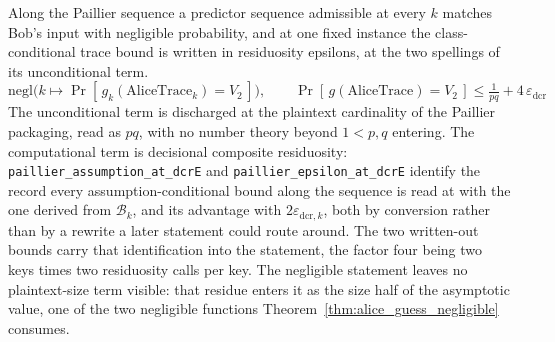 \begin{corollary}
  \label{cor:paillier_security}
  \rocqok
  Along the Paillier sequence a predictor sequence admissible at every $k$
  matches Bob's input with negligible probability, and at one fixed instance
  the class-conditional trace bound is written in residuosity epsilons, at
  the two spellings of its unconditional term.
  \[ \mathrm{negl}\big(k \mapsto
       \Pr[\,g_k(\mathrm{AliceTrace}_k) = V_2\,]\big), \qquad
     \Pr[\,g(\mathrm{AliceTrace}) = V_2\,]
       \le \tfrac{1}{p q} + 4\,\varepsilon_{\mathrm{dcr}} \]
  The unconditional term is discharged at the plaintext cardinality of the
  Paillier packaging, read as $p q$, with no number theory beyond $1 < p, q$
  entering. The computational term is decisional composite residuosity:
  \texttt{paillier\_assumption\_at\_dcrE} and
  \texttt{paillier\_epsilon\_at\_dcrE} identify the record every
  assumption-conditional bound along the sequence is read at with the one
  derived from $\mathcal{B}_k$, and its advantage with
  $2\varepsilon_{\mathrm{dcr},k}$, both by conversion rather than by a rewrite
  a later statement could route around. The two written-out bounds carry that
  identification into the statement, the factor four being two keys times two
  residuosity calls per key. The negligible statement leaves no
  plaintext-size term visible: that residue enters it as the size half of the
  asymptotic value, one of the two negligible functions
  Theorem~\ref{thm:alice_guess_negligible} consumes.
\end{corollary}

